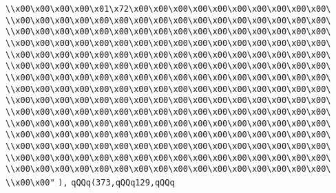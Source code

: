 \verb|\\x00\x00\x00\x00\x01\x72\x00\x00\x00\x00\x00\x00\x00\x00\x00\x00\|\newline
\verb|\\x00\x00\x00\x00\x00\x00\x00\x00\x00\x00\x00\x00\x00\x00\x00\x00\|\newline
\verb|\\x00\x00\x00\x00\x00\x00\x00\x00\x00\x00\x00\x00\x00\x00\x00\x00\|\newline
\verb|\\x00\x00\x00\x00\x00\x00\x00\x00\x00\x00\x00\x00\x00\x00\x00\x00\|\newline
\verb|\\x00\x00\x00\x00\x00\x00\x00\x00\x00\x00\x00\x00\x00\x00\x00\x00\|\newline
\verb|\\x00\x00\x00\x00\x00\x00\x00\x00\x00\x00\x00\x00\x00\x00\x00\x00\|\newline
\verb|\\x00\x00\x00\x00\x00\x00\x00\x00\x00\x00\x00\x00\x00\x00\x00\x00\|\newline
\verb|\\x00\x00\x00\x00\x00\x00\x00\x00\x00\x00\x00\x00\x00\x00\x00\x00\|\newline
\verb|\\x00\x00\x00\x00\x00\x00\x00\x00\x00\x00\x00\x00\x00\x00\x00\x00\|\newline
\verb|\\x00\x00\x00\x00\x00\x00\x00\x00\x00\x00\x00\x00\x00\x00\x00\x00\|\newline
\verb|\\x00\x00\x00\x00\x00\x00\x00\x00\x00\x00\x00\x00\x00\x00\x00\x00\|\newline
\verb|\\x00\x00\x00\x00\x00\x00\x00\x00\x00\x00\x00\x00\x00\x00\x00\x00\|\newline
\verb|\\x00\x00\x00\x00\x00\x00\x00\x00\x00\x00\x00\x00\x00\x00\x00\x00\|\newline
\verb|\\x00\x00\x00\x00\x00\x00\x00\x00\x00\x00\x00\x00\x00\x00\x00\x00\|\newline
\verb|\\x00\x00\x00\x00\x00\x00\x00\x00\x00\x00\x00\x00\x00\x00\x00\x00\|\newline
\verb|\\x00\x00"|\newline
\verb|),|\newline
\verb|qQQq(373,qQQq129,qQQq|\newline
